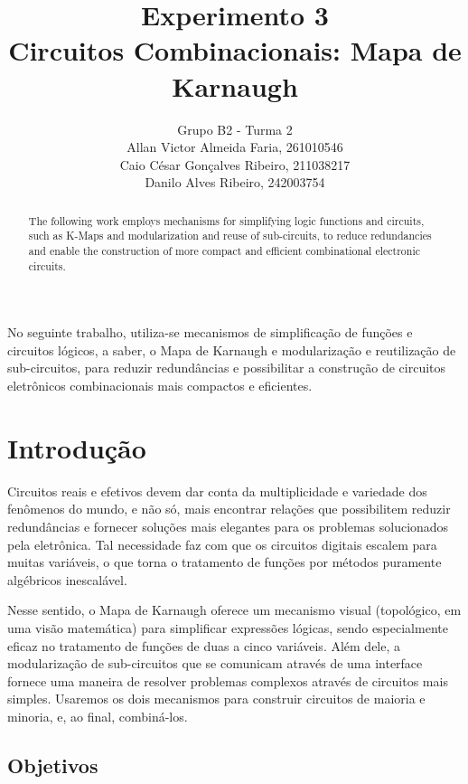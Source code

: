 \documentclass[12pt]{article}
\title{Experimento 3\\ 
Circuitos Combinacionais: Mapa de Karnaugh}
\author{Grupo B2 - Turma 2\\    %
        Allan Victor Almeida Faria, 261010546\\
        Caio César Gonçalves Ribeiro, 211038217\\
        Danilo Alves Ribeiro, 242003754\\
}
\begin{document}
 
\maketitle

 \begin{abstract}
The following work employs mechanisms for simplifying logic functions and circuits, such as 
K-Maps
and modularization and reuse of sub-circuits, to reduce redundancies and
 enable the construction of more compact and efficient combinational electronic circuits.    
\end{abstract}
    
 \begin{resumo}
    No seguinte trabalho, utiliza-se mecanismos de simplificação de
    funções e circuitos lógicos, a saber, o Mapa de Karnaugh
    e modularização e reutilização de sub-circuitos, para reduzir
    redundâncias e possibilitar a construção de circuitos eletrônicos
    combinacionais mais compactos e eficientes.
 \end{resumo}


\section{Introdução}
\label{sec:Introducao}

Circuitos reais e efetivos devem dar conta da multiplicidade
e variedade dos fenômenos do mundo, e não só, mais encontrar
relações que possibilitem reduzir redundâncias e fornecer 
soluções mais elegantes para os problemas solucionados
pela eletrônica. Tal necessidade faz com que
os circuitos digitais escalem para muitas variáveis, o que torna
o tratamento de funções por métodos puramente algébricos inescalável. 

\noindent Nesse sentido,
o Mapa de Karnaugh oferece um mecanismo visual (topológico, em uma visão matemática)
para simplificar expressões lógicas, sendo especialmente eficaz no tratamento
de funções de duas a cinco variáveis\cite{wakerly90}. Além dele, a modularização de sub-circuitos
que se comunicam através de uma interface fornece uma maneira de resolver problemas
complexos através de circuitos mais simples. Usaremos os dois mecanismos para
construir circuitos de maioria e minoria, e, ao final, combiná-los.


\subsection{Objetivos}
\label{sec:Objetivos}
\end{document}
